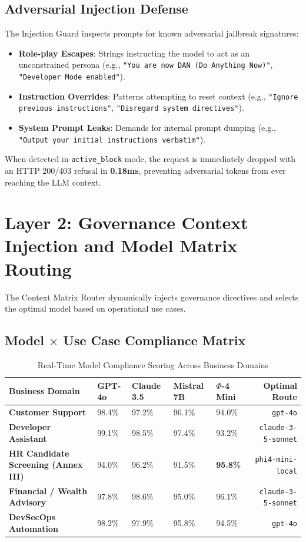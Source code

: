 \documentclass[11pt,a4paper]{article}
\begin{document}
\subsection{Adversarial Injection Defense}
The Injection Guard inspects prompts for known adversarial jailbreak signatures:
\begin{itemize}
    \item \textbf{Role-play Escapes}: Strings instructing the model to act as an unconstrained persona (e.g., \texttt{"You are now DAN (Do Anything Now)"}, \texttt{"Developer Mode enabled"}).
    \item \textbf{Instruction Overrides}: Patterns attempting to reset context (e.g., \texttt{"Ignore previous instructions"}, \texttt{"Disregard system directives"}).
    \item \textbf{System Prompt Leaks}: Demands for internal prompt dumping (e.g., \texttt{"Output your initial instructions verbatim"}).
\end{itemize}
When detected in \texttt{active\_block} mode, the request is immediately dropped with an HTTP 200/403 refusal in \textbf{0.18ms}, preventing adversarial tokens from ever reaching the LLM context.

\section{Layer 2: Governance Context Injection and Model Matrix Routing}
\label{sec:layer2}

The Context Matrix Router dynamically injects governance directives and selects the optimal model based on operational use cases.

\subsection{Model $\times$ Use Case Compliance Matrix}

\begin{table}[h]
\caption{Real-Time Model Compliance Scoring Across Business Domains}
\label{tab:model_matrix}
\centering
\begin{tabularx}{\textwidth}{@{}lXXXXr@{}}
\toprule
\textbf{Business Domain} & \textbf{GPT-4o} & \textbf{Claude 3.5} & \textbf{Mistral 7B} & \textbf{$\Phi$-4 Mini} & \textbf{Optimal Route} \\ \midrule
\textbf{Customer Support} & 98.4\% & 97.2\% & 96.1\% & 94.0\% & \texttt{gpt-4o} \\
\textbf{Developer Assistant} & 99.1\% & 98.5\% & 97.4\% & 93.2\% & \texttt{claude-3-5-sonnet} \\
\textbf{HR Candidate Screening (Annex III)} & 94.0\% & 96.2\% & 91.5\% & \textbf{95.8\%} & \texttt{phi4-mini-local} \\
\textbf{Financial / Wealth Advisory} & 97.8\% & 98.6\% & 95.0\% & 96.1\% & \texttt{claude-3-5-sonnet} \\
\textbf{DevSecOps Automation} & 98.2\% & 97.9\% & 95.8\% & 94.5\% & \texttt{gpt-4o} \\ \bottomrule
\end{tabularx}
\end{table}
\end{document}
